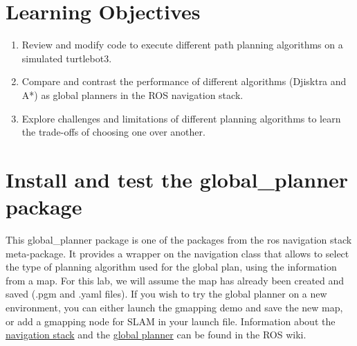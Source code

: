 \documentclass[12pt]{article}
\begin{document}
	\MakeScribeTop

\setlength{\parindent}{15pt}


\section{Learning Objectives}
\begin{enumerate}
    \item Review and modify code to execute different path planning algorithms on a simulated turtlebot3.
    
    \item Compare and contrast the performance of different algorithms (Djisktra and A*) as global planners in the ROS navigation stack.
    
    \item Explore challenges and limitations of different planning algorithms to learn the trade-offs of choosing one over another.
\end{enumerate}


\section{Install and test the global\_planner package}

This global\_planner package is one of the packages from the ros navigation stack meta-package. It provides a wrapper on the navigation class that allows to select the type of planning algorithm used for the global plan, using the information from a map. For this lab, we will assume the map has already been created and saved (.pgm and .yaml files). If you wish to try the global planner on a new environment, you can either launch the gmapping demo and save the new map, or add a gmapping node for SLAM in your launch file. Information about the 
\href{http://wiki.ros.org/nav_core}{navigation stack} and the \href{http://wiki.ros.org/global_planner}{global planner} can be found in the ROS wiki.
\end{document}
